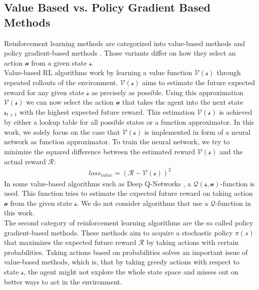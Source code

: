 \subsection*{Value Based vs. Policy Gradient Based Methods}\label{value_policy_based_methods}
Reinforcement learning methods are categorized into value-based methods and policy gradient-based methods \cite{tdlearning,policygradient}. Those variants differ on how they select an action $\mathcal{u}$ from a given state $\mathcal{s}$.\\
Value-based RL algorithms work by learning a value function $\mathcal{V(s)}$ through repeated rollouts of the environment. $\mathcal{V(s)}$ aims to estimate the future expected reward for any given state $\mathcal{s}$ as precisely as possible. Using this approximation $\mathcal{V(s)}$ we can now select the action $\mathcal{u}$ that takes the agent into the next state $\mathcal{s}_{t+1}$ with the highest expected future reward. This estimation $\mathcal{V(s)}$ is achieved by either a lookup table for all possible states or a function approximator. In this work, we solely focus on the case that $\mathcal{V(s)}$ is implemented in form of a neural network as function approximator. To train the neural network, we try to minimize the squared difference between the estimated reward $\mathcal{V(s)}$ and the actual reward $\mathcal{R}$:
\begin{gather*}
loss_{value}=(\mathcal{R}-\mathcal{V(s)})^2
\end{gather*}
In some value-based algorithms such as Deep Q-Networks \cite{mnih2013playing}, a $\mathcal{Q(s,u)}$-function is used. This function tries to estimate the expected future reward on taking action $\mathcal{u}$ from the given state $\mathcal{s}$. We do not consider algorithms that use a $\mathcal{Q}$-function in this work.\\
The second category of reinforcement learning algorithms are the so called policy gradient-based methods. These methods aim to acquire a stochastic policy $\pi(s)$ that maximizes the expected future reward $\mathcal{R}$ by taking actions with certain probabilities. Taking actions based on probabilities solves an important issue of value-based methods, which is, that by taking greedy actions with respect to state  $\mathcal{s}$, the agent might not explore the whole state space and misses out on better ways to act in the environment.

